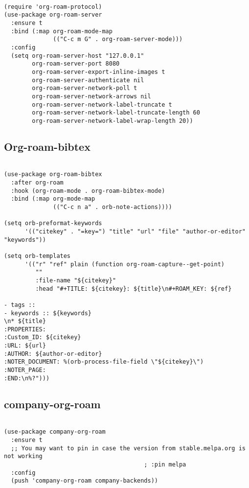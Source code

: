 \documentclass[12pt]{article}
\begin{document}
\begin{verbatim}

(require 'org-roam-protocol)
(use-package org-roam-server
  :ensure t
  :bind (:map org-roam-mode-map
              (("C-c m G" . org-roam-server-mode)))
  :config
  (setq org-roam-server-host "127.0.0.1"
        org-roam-server-port 8080
        org-roam-server-export-inline-images t
        org-roam-server-authenticate nil
        org-roam-server-network-poll t
        org-roam-server-network-arrows nil
        org-roam-server-network-label-truncate t
        org-roam-server-network-label-truncate-length 60
        org-roam-server-network-label-wrap-length 20))
\end{verbatim}


\subsection{Org-roam-bibtex}
\label{sec:org500e4a3}
\begin{verbatim}

(use-package org-roam-bibtex
  :after org-roam
  :hook (org-roam-mode . org-roam-bibtex-mode)
  :bind (:map org-mode-map
              (("C-c n a" . orb-note-actions))))

(setq orb-preformat-keywords
      '(("citekey" . "=key=") "title" "url" "file" "author-or-editor" "keywords"))

(setq orb-templates
      '(("r" "ref" plain (function org-roam-capture--get-point)
         ""
         :file-name "${citekey}"
         :head "#+TITLE: ${citekey}: ${title}\n#+ROAM_KEY: ${ref}

- tags ::
- keywords :: ${keywords}
\n* ${title}
:PROPERTIES:
:Custom_ID: ${citekey}
:URL: ${url}
:AUTHOR: ${author-or-editor}
:NOTER_DOCUMENT: %(orb-process-file-field \"${citekey}\")
:NOTER_PAGE:
:END:\n%?")))

\end{verbatim}

\subsection{company-org-roam}
\label{sec:org89a78e0}
\begin{verbatim}

(use-package company-org-roam
  :ensure t
  ;; You may want to pin in case the version from stable.melpa.org is not working 
                                        ; :pin melpa
  :config
  (push 'company-org-roam company-backends))
\end{verbatim}
\end{document}
